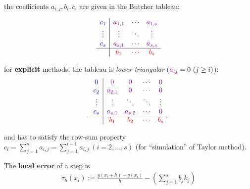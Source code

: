 the coefficients $a_{i,j},b_i,c_i$ are given in the Butcher tableau:

\begin{snugshade*}
    \begin{align*}
        \begin{array}{c|ccc}
        {\color{blue}c_1}
            & {\color{purple}a_{1,1}} & {\color{purple}\cdots} & {\color{purple}a_{1,s}} \\
            {\color{blue}\vdots} & {\color{purple}\vdots}  & {\color{purple}\ddots} & {\color{purple}\vdots}  \\
            {\color{blue}c_s}    & {\color{purple}a_{s,1}} & {\color{purple}\cdots} & {\color{purple}a_{s,s}} \\
            \hline
            & {\color{red}b_1}        & {\color{red}\cdots}    & {\color{red}b_s}
        \end{array}
    \end{align*}
\end{snugshade*}

for \textbf{explicit} methods, the tableau is \emph{lower triangular} (${\color{purple}a_{ij}} = 0\ (j \geq i)$):
\begin{align*}
    \begin{array}{c|cccc}
    {\color{blue}0}
        & {\color{purple}0}       & {\color{purple}0}       & {\color{purple}\cdots} & {\color{purple}0}      \\
        {\color{blue}c_2}    & {\color{purple}a_{2,1}} & {\color{purple}0}       & {\color{purple}\cdots} & {\color{purple}0}      \\
        {\color{blue}\vdots} & {\color{purple}\vdots}  & {\color{purple}\ddots}  & {\color{purple}\ddots} & {\color{purple}\vdots} \\
        {\color{blue}c_s}    & {\color{purple}a_{s,1}} & {\color{purple}a_{s,2}} & {\color{purple}\cdots} & {\color{purple}0}      \\
        \hline
        & {\color{red}b_1}        & {\color{red}b_2}        & {\color{red}\cdots}    & {\color{red}b_s}
    \end{array}
\end{align*}

and has to satisfy the row-sum property $c_i = \sum_{j=1}^{s}a_{i,j} = \sum_{j=1}^{i-1}a_{i,j}\ (i=2,\ldots,s)$
(for ``simulation'' of Taylor method).

The \textbf{local error} of a step is
\begin{align*}
    \tau_{h}(x_{i}) := \frac{y(x_{i}+h)-y(x_{i})}{h}-\left(\sum_{j=1}^{s}b_{j}k_{j}\right)
\end{align*}

